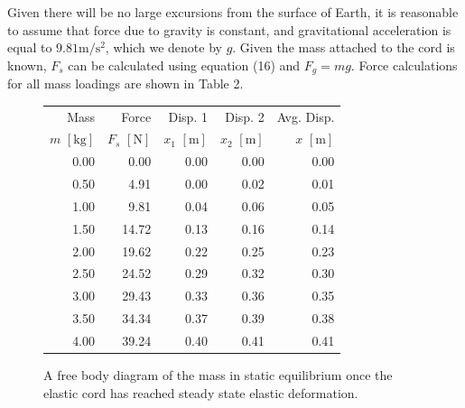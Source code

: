 \documentclass[a4paper]{article}
\begin{document}
Given there will be no large excursions from the surface of Earth, it is reasonable to assume that force due to gravity is constant, and gravitational acceleration is equal to $9.81\si{\meter\per\second^2}$, which we denote by $g$. Given the mass attached to the cord is known, $F_s$ can be calculated using equation (16) and $F_g = mg$. Force calculations for all mass loadings are shown in Table 2.

\begin{figure}[h]
	\begin{minipage}{0.40\textwidth}
		\centering
		\caption{A free body diagram of the mass in static equilibrium once the elastic cord has reached steady state elastic deformation.}
	\end{minipage}
	\hspace{0.5cm}
	\begin{minipage}{0.53\textwidth}
		\centering
		\begin{tabular}{rrrrr}
			\toprule
			Mass & Force & Disp.  1 & Disp.  2 & Avg. Disp. \\
			$m$ $[\si{\kilogram}]$ & $F_s$ $[\si{\newton}]$ & $x_1$ $[\si{\meter}]$ & $x_2$ $[\si{\meter}]$ & $x$ $[\si{\meter}]$ \\
			\midrule
			0.00 &  0.00 & 0.00 & 0.00 & 0.00\\
			0.50 &  4.91 & 0.00 & 0.02 & 0.01\\
			1.00 &  9.81 & 0.04 & 0.06 & 0.05\\
			1.50 & 14.72 & 0.13 & 0.16 & 0.14\\
			2.00 & 19.62 & 0.22 & 0.25 & 0.23\\
			2.50 & 24.52 & 0.29 & 0.32 & 0.30\\
			3.00 & 29.43 & 0.33 & 0.36 & 0.35\\
			3.50 & 34.34 & 0.37 & 0.39 & 0.38\\
			4.00 & 39.24 & 0.40 & 0.41 & 0.41\\
			\bottomrule
		\end{tabular}
	\end{minipage}
\end{figure}
\end{document}

